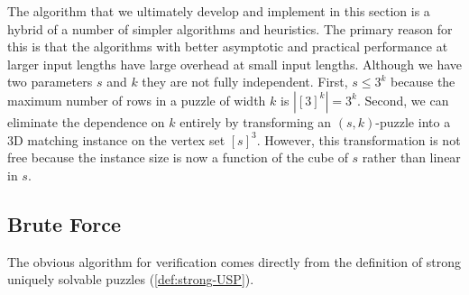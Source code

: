 \documentclass[11pt]{article}
\begin{document}
The algorithm that we ultimately develop and implement in this section
is a hybrid of a number of simpler algorithms and heuristics.  The
primary reason for this is that the algorithms with better asymptotic
and practical performance at larger input lengths have large overhead
at small input lengths.  Although we have two parameters $s$ and $k$
they are not fully independent.  First, $s \le 3^k$ because the
maximum number of rows in a puzzle of width $k$ is $|[3]^k| = 3^k$.
Second, we can eliminate the dependence on $k$ entirely by
transforming an $(s,k)$-puzzle into a 3D matching instance on the
vertex set $[s]^3$.  However, this transformation is not free because
the instance size is now a function of the cube of $s$ rather than
linear in $s$.

\subsection{Brute Force}

The obvious algorithm for verification comes directly from the
definition of strong uniquely solvable puzzles
(\autoref{def:strong-USP}). 
\end{document}
